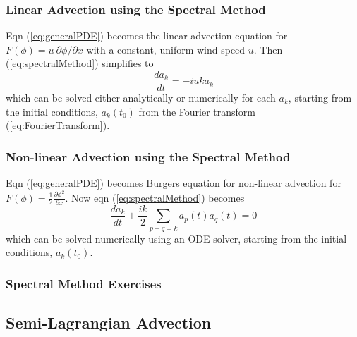 \subsubsection{Linear Advection using the Spectral Method}

Eqn (\ref{eq:generalPDE}) becomes the linear advection equation for
$F\left(\phi\right)=u\ \partial\phi/\partial x$ with a constant,
uniform wind speed $u$. Then (\ref{eq:spectralMethod}) simplifies
to
\begin{equation}
\frac{da_{k}}{dt}=-iuka_{k}\label{eq:spectralLinearAdvect}
\end{equation}
which can be solved either analytically or numerically for each $a_{k}$,
starting from the initial conditions, $a_{k}\left(t_{0}\right)$ from
the Fourier transform (\ref{eq:FourierTransform}). 

\subsubsection{Non-linear Advection using the Spectral Method}

Eqn (\ref{eq:generalPDE}) becomes Burgers equation for non-linear
advection for $F\left(\phi\right)=\frac{1}{2}\frac{\partial\phi^{2}}{\partial x}$.
Now eqn (\ref{eq:spectralMethod}) becomes
\begin{equation}
\frac{da_{k}}{dt}+\frac{ik}{2}\sum_{p+q=k}a_{p}\left(t\right)a_{q}\left(t\right)=0\label{eq:spectralBurger}
\end{equation}
which can be solved numerically using an ODE solver, starting from
the initial conditions, $a_{k}\left(t_{0}\right)$.

\subsubsection{Spectral Method Exercises}


\subsection{Semi-Lagrangian Advection}\label{subsec:SL}

